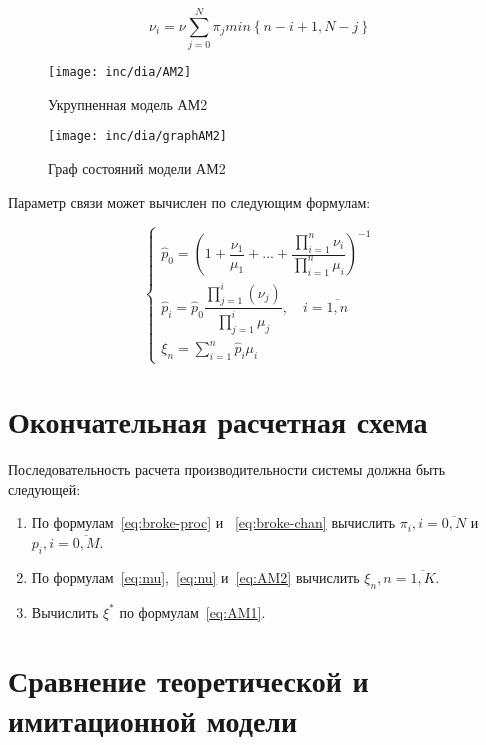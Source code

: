 \documentclass[utf8x, 12pt]{G7-32} %
\begin{document}
\begin{equation}
\label{eq:nu}
\nu_i = \nu \sum \limits_{j=0}^N \pi_j min \left\lbrace n-i+1, N-j \right\rbrace
\end{equation}



\begin{figure}[ht]
\centering
\texttt{[image: inc/dia/AM2]}
\caption{Укрупненная модель АМ2}
\label{fig:AM2}
\end{figure}

\begin{figure}[ht]
\centering
\texttt{[image: inc/dia/graphAM2]}
\caption{Граф состояний модели АМ2}
\label{fig:graphAM2}
\end{figure}


Параметр связи может вычислен по следующим формулам:


\begin{equation}
\label{eq:AM2}
\left\{
   \begin{array}{lcl}
	\hat{p}_{0} = \left( 1 + \dfrac{\nu_1}{\mu_1} +  ... + \dfrac{\prod \limits_{i=1}^n \nu_i}{\prod \limits_{i=1}^n \mu_i} \right) ^{-1} \\
	\hat{p}_{i} = \hat{p}_{0} \dfrac{\prod \limits_{j=1}^{i} (\nu_j)}{\prod \limits_{j=1}^i \mu_{j}}, \quad i = \overline{1,n}  \\ 
	\xi_n = \sum \limits_{i=1}^n \hat{p}_i \mu_i
   \end{array}
\right.
\end{equation}


\section{Окончательная расчетная схема}
Последовательность расчета производительности системы должна быть следующей:

\begin{enumerate}
\item По формулам~\ref{eq:broke-proc} и ~\ref{eq:broke-chan} вычислить $\pi_i, i=\overline{0,N}$ и $p_i, i=\overline{0,M} $.
\item По формулам~\ref{eq:mu},~\ref{eq:nu} и~\ref{eq:AM2} вычислить $\xi_n, n=\overline{1,K}$.
\item Вычислить $\xi^{*}$ по формулам~\ref{eq:AM1}.
\end{enumerate}


\section{Сравнение теоретической и имитационной модели}
\end{document}
